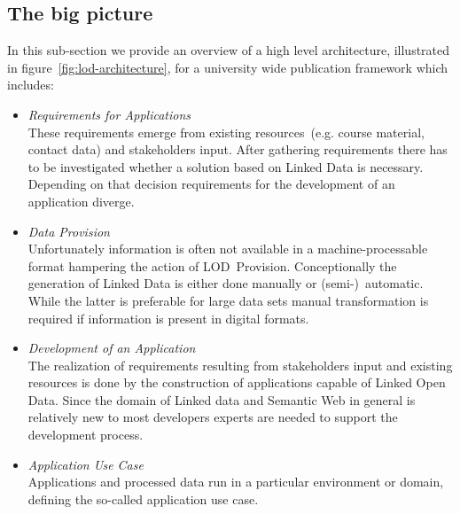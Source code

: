 \documentclass{article}
\begin{document}
\subsection{The big picture}
In this sub-section we provide an overview of a high level architecture, illustrated in figure~\ref{fig:lod-architecture}, for a university wide publication framework which includes:
\begin{itemize}
  \item \textit{Requirements for Applications}~\\
  These requirements emerge from existing resources~(e.g. course material, contact data) and stakeholders input. After gathering requirements there has to be investigated whether a solution based on Linked Data is necessary. Depending on that decision requirements for the development of an application diverge. 
  \item \textit{Data Provision}~\\
  Unfortunately information is often not available in a machine-processable format hampering the action of LOD~Provision. Conceptionally the generation of Linked Data is either done manually or (semi-)~automatic. While the latter is preferable for large data sets manual transformation is required if information is present in digital formats.   
  \item \textit{Development of an Application}~\\
  The realization of requirements resulting from stakeholders input and existing resources is done by the construction of applications capable of Linked Open Data. Since the domain of Linked data and Semantic Web in general is relatively new to most developers experts are needed to support the development process. 
  \item \textit{Application Use Case}~\\
  Applications and processed data run in a particular environment or domain, defining the so-called application use case. 
\end{itemize}
\end{document}
